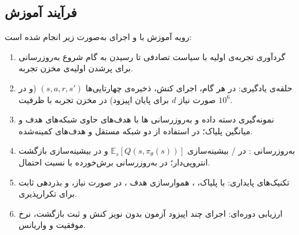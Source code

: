 








\subsection{فرآیند آموزش}

رویه آموزش با  و اجرای  به‌صورت زیر انجام شده است:
\begin{enumerate}
  \item گردآوری تجربه‌ی اولیه با سیاست تصادفی تا رسیدن به گام شروع به‌روزرسانی برای پرشدن اولیه‌ی مخزن تجربه.
  \item حلقه‌ی یادگیری: در هر گام، اجرای کنش، ذخیره‌ی چهار‌تایی‌ها \((s,a,r,s')\) (و در صورت نیاز \(d\) برای پایان اپیزود) در مخزن تجربه با ظرفیت \(10^6\).
  \item نمونه‌گیری دسته داده  و به‌روزرسانی ها با هدف‌های حاوی شبکه‌های هدف و میانگین پلیاک؛ در 
   استفاده از دو شبکه  مستقل و هدف‌های کمینه‌شده.
  \item به‌روزرسانی : در / بیشینه‌سازی \(\mathbb{E}_s[Q(s,\pi_\theta(s))]\) و در  بیشینه‌سازی بازگشت انتروپی‌دار؛ در  به‌روزرسانی برش‌خورده با نسبت احتمال.
  \item تکنیک‌های پایداری:  با پلیاک، ، هموارسازی هدف ،  در صورت نیاز، و بذردهی ثابت برای تکرارپذیری.
  \item ارزیابی دوره‌ای: اجرای چند اپیزود آزمون بدون نویز کنش و ثبت بازگشت، نرخ موفقیت و واریانس.
\end{enumerate}

